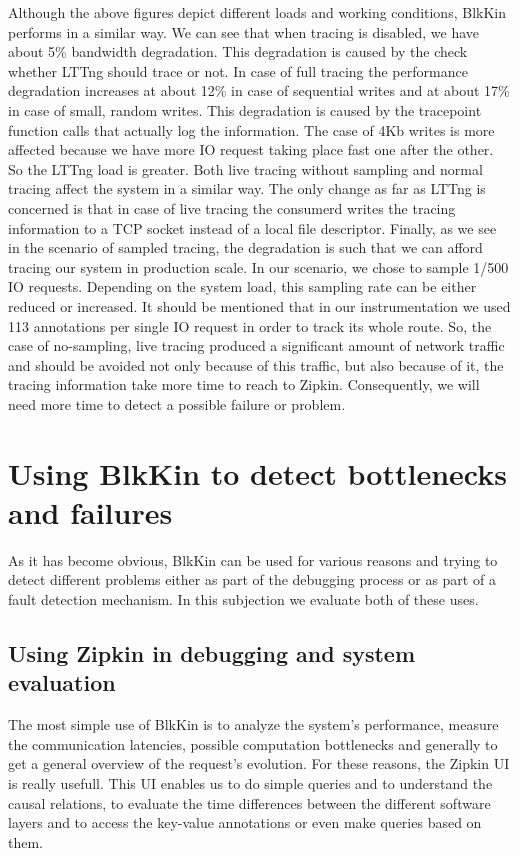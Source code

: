 Although the above figures depict different loads and working conditions, BlkKin
performs in a similar way. We can see that when tracing is disabled, we have
about 5\% bandwidth degradation. This degradation is caused by the check whether
LTTng should trace or not. In case of full tracing the performance degradation
increases at about 12\% in case of sequential writes and at about 17\% in case
of small, random writes. This degradation is caused by the tracepoint function
calls that actually log the information. The case of 4Kb writes is more affected
because we have more IO request taking place fast one after the other. So the
LTTng load is greater. Both live tracing without sampling and normal tracing
affect the system in a similar way. The only change as far as LTTng is concerned
is that in case of live tracing the consumerd writes the tracing information to
a TCP socket instead of a local file descriptor. Finally, as we see in the
scenario of sampled tracing, the degradation is such that we can afford tracing
our system in production scale. In our scenario, we chose to sample 1/500 IO
requests. Depending on the system load, this sampling rate can be either reduced
or increased. It should be mentioned that in our instrumentation we used 113
annotations per single IO request in order to track its whole route. So, the
case of no-sampling, live tracing produced a significant amount of network
traffic and should be avoided not only because of this traffic, but also because
of it, the tracing information take more time to reach to Zipkin. Consequently,
we will need more time to detect a possible failure or problem. 

\section{Using BlkKin to detect bottlenecks and failures}\label{sec:failures}

As it has become obvious, BlkKin can be used for various reasons and trying to
detect different problems either as part of the debugging process or as part of
a fault detection mechanism. In this subjection we evaluate both of these uses.

\subsection{Using Zipkin in debugging and system evaluation}
The most simple use of BlkKin is to analyze the system's performance, measure
the communication latencies, possible computation bottlenecks and generally to
get a general overview of the request's evolution.  For these reasons, the
Zipkin UI is really usefull. This UI enables us to do simple queries and to
understand the causal relations, to evaluate the time differences between the
different software layers and to access the key-value annotations or even make
queries based on them.


